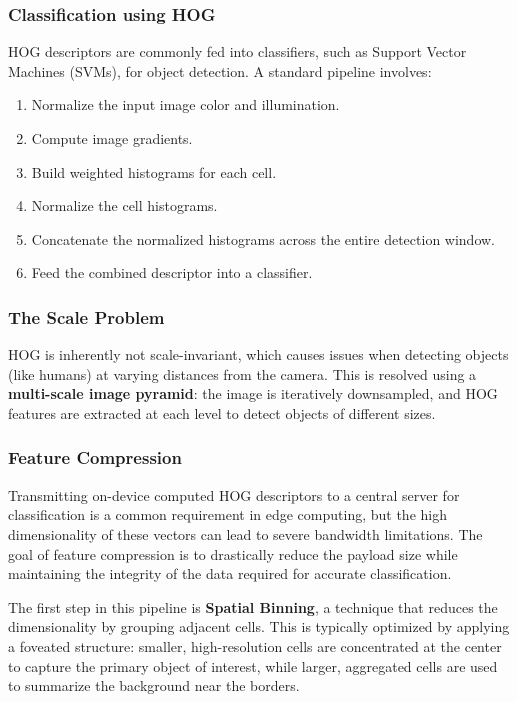 \subsubsection{Classification using HOG}
HOG descriptors are commonly fed into classifiers, such as Support Vector Machines (SVMs), for object detection. A standard pipeline involves:
\begin{enumerate}
    \item Normalize the input image color and illumination.
    \item Compute image gradients.
    \item Build weighted histograms for each cell.
    \item Normalize the cell histograms.
    \item Concatenate the normalized histograms across the entire detection window.
    \item Feed the combined descriptor into a classifier.
\end{enumerate}

\subsubsection{The Scale Problem}
HOG is inherently not scale-invariant, which causes issues when detecting objects (like humans) at varying distances from the camera. 
This is resolved using a \textbf{multi-scale image pyramid}: the image is iteratively downsampled, and HOG features 
are extracted at each level to detect objects of different sizes.

\subsubsection{Feature Compression}
Transmitting on-device computed HOG descriptors to a central server for classification is a common requirement in edge computing, 
but the high dimensionality of these vectors can lead to severe bandwidth limitations. 
The goal of feature compression is to drastically reduce the payload size while maintaining the integrity of the data required for accurate classification.

The first step in this pipeline is \textbf{Spatial Binning}, a technique that reduces the dimensionality by grouping adjacent cells. 
This is typically optimized by applying a foveated structure: 
smaller, high-resolution cells are concentrated at the center to capture the primary object of interest, 
while larger, aggregated cells are used to summarize the background near the borders.

